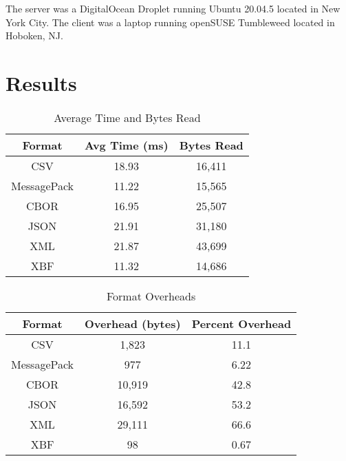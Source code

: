 \documentclass[conference]{IEEEtran}
\begin{document}
The server was a DigitalOcean Droplet\cite{digital_ocean} running Ubuntu 20.04.5 located in New York City. The client was a laptop running openSUSE Tumbleweed located in Hoboken, NJ.

\section{Results}

\begin{table}[htbp]
	\caption{Average Time and Bytes Read}
	\begin{center}
		\begin{tabular}{|c|c|c|}
			\hline
			\textbf{Format} & \textbf{Avg Time (ms)} & \textbf{Bytes Read} \\
			\hline
			CSV             & 18.93                  & 16,411              \\
			MessagePack     & 11.22                  & 15,565              \\
			CBOR            & 16.95                  & 25,507              \\
			JSON            & 21.91                  & 31,180              \\
			XML             & 21.87                  & 43,699              \\
			XBF             & 11.32                  & 14,686              \\
			\hline
		\end{tabular}
	\end{center}\label{time_and_bytes}
\end{table}

\begin{table}[htbp]
	\caption{Format Overheads}
	\begin{center}
		\begin{tabular}{|c|c|c|}
			\hline
			\textbf{Format} & \textbf{Overhead (bytes)} & \textbf{Percent Overhead} \\
			\hline
			CSV             & 1,823                     & 11.1                      \\
			MessagePack     & 977                       & 6.22                      \\
			CBOR            & 10,919                    & 42.8                      \\
			JSON            & 16,592                    & 53.2                      \\
			XML             & 29,111                    & 66.6                      \\
			XBF             & 98                        & 0.67                      \\
			\hline
		\end{tabular}
	\end{center}\label{overhead}
\end{table}
\end{document}
